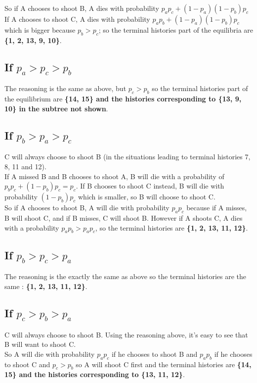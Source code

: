 \documentclass[a4paper]{article}
\begin{document}
So if A chooses to shoot B, A dies with probability 
$p_ap_c + (1-p_a)(1-p_b)p_c$\\

If A chooses to shoot C, A dies with probability $p_ap_b + (1-p_a)(1-p_b)p_c$
which is bigger because $p_b > p_c$; so the terminal histories part of the 
equilibria are \textbf{\{1, 2, 13, 9, 10\}}.

\subsection{If $p_a > p_c > p_b$} The reasoning is the same as above, but 
$p_c>p_b$ so the terminal histories part of the equilibrium are \textbf{\{14,
15\} and the histories corresponding to \{13, 9, 10\} in the subtree not shown}.

\subsection{If $p_b > p_a > p_c$} C will always choose to shoot B (in the
situations leading to terminal histories 7, 8, 11 and 12).\\

If A missed B and B chooses to shoot A, B will die with a probability of 
$p_bp_c + (1-p_b)p_c = p_c$. If B chooses to shoot C instead, B will die with
probability $(1-p_b)p_c$ which is smaller, so B will choose to shoot C.\\

So if A chooses to shoot B, A will die with probability $p_ap_c$ because if A
misses, B will shoot C, and if B misses, C will shoot B. However if A shoots C,
A dies with a probability $p_ap_b > p_ap_c$, so the terminal histories are 
\textbf{{\{1, 2, 13, 11, 12\}}}.

\subsection{If $p_b > p_c > p_a$} The reasoning is the exactly the same as 
above so the terminal histories are the same : \textbf{{\{1, 2, 13, 11, 12\}}}.

\subsection{If $p_c > p_b > p_a$} C will always choose to shoot B. Using the
reasoning above, it's easy to see that B will want to shoot C.\\

So A will die with probability $p_ap_c$ if he chooses to shoot B and $p_ap_b$
if he chooses to shoot C and $p_c>p_b$ so A will shoot C first and the terminal
histories are \textbf{\{14, 15\} and the histories corresponding to \{13, 11,
12\}}.
\end{document}
